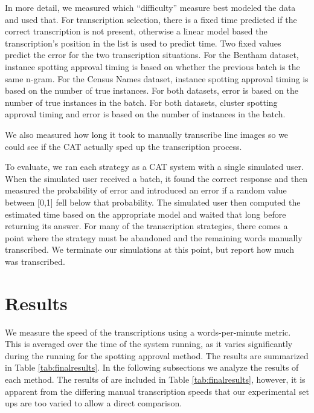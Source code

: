 \documentclass[ms,electronic,twosidetoc,letterpaper,chaptercenter,parttop,lof,lot]{byumsphd}
\begin{document}
In more detail, we measured which ``difficulty'' measure best modeled the data and used that. For transcription selection, there is a fixed time predicted if the correct transcription is not present, otherwise a linear model based the transcription's position in the list is used to predict time. Two fixed values predict the error for the two transcription situations. 
For the Bentham dataset, instance spotting approval timing is based on whether the previous batch is the same n-gram. For the Census Names dataset, instance spotting approval timing is based on the number of true instances. For both datasets, error is based on the number of true instances in the batch. For both datasets, cluster spotting approval timing and error is based on the number of instances in the batch.

We also measured how long it took to manually transcribe line images so we could see if the CAT actually sped up the transcription process.

To evaluate, we ran each strategy as a CAT system with a single simulated user. When the simulated user received a batch, it found the correct response and then measured the probability of error and introduced an error if a random value between [0,1] fell below that probability. The simulated user then computed the estimated time based on the appropriate model and waited that long before returning its answer. For many of the transcription strategies, there comes a point where the strategy must be abandoned and the remaining words manually transcribed. We terminate our simulations at this point, but report how much was transcribed.

\section{Results}

We measure the speed of the transcriptions using a words-per-minute metric. This is averaged over the time of the system running, as it varies significantly during the running for the spotting approval method. The results are summarized in Table \ref{tab:finalresults}. In the following subsections we analyze the results of each method. The results of \cite{Zagoris2015} are included in Table \ref{tab:finalresults}, however, it is apparent from the differing manual transcription speeds that our experimental set ups are too varied to allow a direct comparison.
\end{document}
